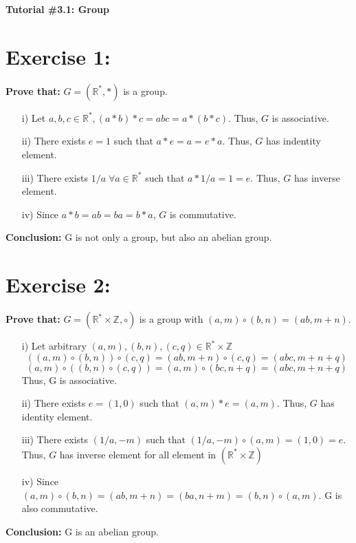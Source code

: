 \documentclass{article}
\newcommand{\Z}{\mathbb{Z}}
\newcommand{\R}{\mathbb{R}}
\begin{document}
	\centering
	\LARGE\textbf{Tutorial \#3.1: Group}
	
	\justify\Large
	
	\section{Exercise 1:}
		\textbf{Prove that: } $G = (\R^*, *)$ is a group.
		\begin{enumerate}
			\item[i)]
				Let $a, b, c \in \R^*, (a*b)*c = abc = a*(b*c)$. Thus, $G$ is associative.
			\item[ii)]
				There exists $e=1$ such that $a*e = a = e*a$. Thus, $G$ has indentity element.
			\item[iii)]
				There exists $1/a \; \forall a \in \R^*$  such that $a*1/a = 1 = e$. Thus, $G$ has inverse element.
			\item [iv)]
				Since $a*b = ab = ba = b*a$, $G$ is commutative.
		\end{enumerate}
		\textbf{Conclusion:} G is not only a group, but also an abelian group.
	
	\section{Exercise 2:}
		\textbf{Prove that:} $G = (\R^*\times\Z, \circ)$ is a group with $(a,m) \circ (b,n) = (ab, m+n)$.
		\begin{enumerate}
			\item [i)]
				Let arbitrary $(a,m),(b,n),(c,q) \in \R^*\times\Z$
				\begin{equation*}
					((a,m) \circ (b,n))\circ(c,q) = (ab, m+n)\circ(c,q) = (abc, m+n+q)
				\end{equation*}
				\begin{equation*}
					(a,m) \circ ((b,n)\circ(c,q)) = (a,m)\circ(bc, n+q) = (abc, m+n+q)
				\end{equation*}
				Thus, G is associative.
			\item [ii)]
				There exists $e = (1,0)$ such that $(a, m)*e = (a, m)$. Thus, $G$ has identity element.
			\item[iii)]
				There exists $(1/a,-m)$ such that $(1/a,-m) \circ (a,m) = (1,0) = e$. Thus, $G$ has inverse element for all element in $(\R^*\times\Z)$
			\item[iv)]
				Since $(a,m) \circ (b,n) = (ab, m+n) = (ba, n+m) = (b,n) \circ (a,m)$. G is also commutative.\\
		\end{enumerate}
		\textbf{Conclusion:} G is an abelian group.
		
\end{document}
